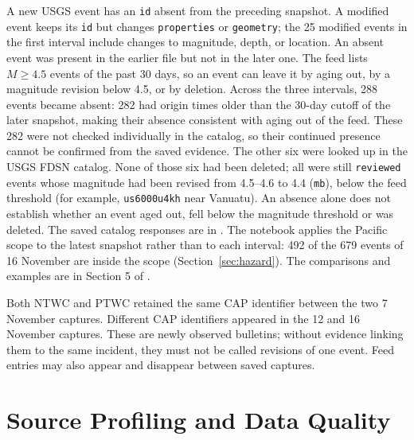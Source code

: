 \documentclass[a4paper,11pt,oneside]{book}
\begin{document}
A new USGS event has an \texttt{id} absent from the preceding snapshot.
A modified event keeps its \texttt{id} but changes \texttt{properties}
or \texttt{geometry}; the 25 modified events in the first interval
include changes to magnitude, depth, or location.
An absent event was present in the earlier file but not in the later one.
The feed lists $M \geq 4.5$ events of the past 30 days, so an event can leave it by aging out, by a magnitude revision below 4.5, or by deletion.
Across the three intervals, 288 events became absent: 282 had origin times older than the 30-day cutoff of the later snapshot, making their absence consistent with aging out of the feed. These 282 were not checked individually in the catalog, so their continued presence cannot be confirmed from the saved evidence. The other six were looked up in the USGS FDSN catalog.
None of those six had been deleted; all were still \texttt{reviewed} events whose magnitude had been revised from 4.5--4.6 to 4.4 (\texttt{mb}), below the feed threshold (for example, \texttt{us6000u4kh} near Vanuatu).
An absence alone does not establish whether an event aged out, fell below the magnitude threshold or was deleted.
The saved catalog responses are in .
The notebook applies the Pacific scope to the latest snapshot rather than to each interval: 492 of the 679 events of 16 November are inside the scope (Section~\ref{sec:hazard}).
The comparisons and examples are in Section 5 of
.

Both NTWC and PTWC retained the same CAP identifier between the two
7 November captures. Different CAP identifiers appeared in the
12 and 16 November captures. These are newly observed bulletins;
without evidence linking them to the same incident, they must not be
called revisions of one event. Feed entries may also appear and
disappear between saved captures.

\section{Source Profiling and Data Quality}
\label{sec:profiling}
\end{document}

